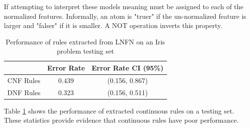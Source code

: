 \noindent
\begin{minipage}[t]{0.35\textwidth}
If attempting to interpret these models meaning must be assigned to each of the normalized features. Informally, an atom is "truer" if the un-normalized feature is larger and "falser" if it is smaller. A NOT operation inverts this property.\\
\end{minipage}
\hspace{0.05\textwidth}
\begin{minipage}[t]{0.6\textwidth}
\begin{table}[H]
	\begin{center}
		\begin{tabular}{| c | c | c |}
			\hline
			& Error Rate & Error Rate CI (95\%) \\
			\hline
			\hline
			CNF Rules & 0.439 & (0.156, 0.867) \\
			\hline
			DNF Rules & 0.323 & (0.156, 0.511) \\
			\hline
		\end{tabular}
	\end{center}
	\caption{Performance of rules extracted from LNFN on an Iris problem testing set}
	\label{tab:iris-rule-peformance-comp}
\end{table}
\end{minipage}

Table \ref{tab:iris-rule-peformance-comp} shows the performance of extracted continuous rules on a testing set. These statistics provide evidence that continuous rules have poor performance.


